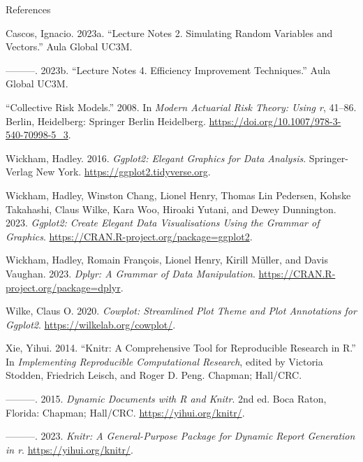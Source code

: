 \documentclass[
  ignorenonframetext,
]{beamer}
\newlength{\cslhangindent}
\newlength{\cslentryspacingunit} %
\newenvironment{CSLReferences}[2] %
 {%
  \setlength{\parindent}{0pt}
  \ifodd #1
  \let\oldpar\par
  \def\par{\hangindent=\cslhangindent\oldpar}
  \fi
  \setlength{\parskip}{#2\cslentryspacingunit}
 }%
 {}
\begin{document}
\begin{frame}{References}
\protect\hypertarget{references}{}
\hypertarget{refs}{}
\begin{CSLReferences}{1}{0}
\leavevmode{}%
Cascos, Ignacio. 2023a. {``Lecture Notes 2. Simulating Random Variables
and Vectors.''} Aula Global UC3M.

\leavevmode{}%
---------. 2023b. {``Lecture Notes 4. Efficiency Improvement
Techniques.''} Aula Global UC3M.

\leavevmode{}%
{``Collective Risk Models.''} 2008. In \emph{Modern Actuarial Risk
Theory: Using r}, 41--86. Berlin, Heidelberg: Springer Berlin
Heidelberg. \url{https://doi.org/10.1007/978-3-540-70998-5_3}.

\leavevmode{}%
Wickham, Hadley. 2016. \emph{Ggplot2: Elegant Graphics for Data
Analysis}. Springer-Verlag New York.
\url{https://ggplot2.tidyverse.org}.

\leavevmode{}%
Wickham, Hadley, Winston Chang, Lionel Henry, Thomas Lin Pedersen,
Kohske Takahashi, Claus Wilke, Kara Woo, Hiroaki Yutani, and Dewey
Dunnington. 2023. \emph{Ggplot2: Create Elegant Data Visualisations
Using the Grammar of Graphics}.
\url{https://CRAN.R-project.org/package=ggplot2}.

\leavevmode{}%
Wickham, Hadley, Romain François, Lionel Henry, Kirill Müller, and Davis
Vaughan. 2023. \emph{Dplyr: A Grammar of Data Manipulation}.
\url{https://CRAN.R-project.org/package=dplyr}.

\leavevmode{}%
Wilke, Claus O. 2020. \emph{Cowplot: Streamlined Plot Theme and Plot
Annotations for Ggplot2}. \url{https://wilkelab.org/cowplot/}.

\leavevmode{}%
Xie, Yihui. 2014. {``Knitr: A Comprehensive Tool for Reproducible
Research in {R}.''} In \emph{Implementing Reproducible Computational
Research}, edited by Victoria Stodden, Friedrich Leisch, and Roger D.
Peng. Chapman; Hall/CRC.

\leavevmode{}%
---------. 2015. \emph{Dynamic Documents with {R} and Knitr}. 2nd ed.
Boca Raton, Florida: Chapman; Hall/CRC. \url{https://yihui.org/knitr/}.

\leavevmode{}%
---------. 2023. \emph{Knitr: A General-Purpose Package for Dynamic
Report Generation in r}. \url{https://yihui.org/knitr/}.

\end{CSLReferences}
\end{frame}
\end{document}
